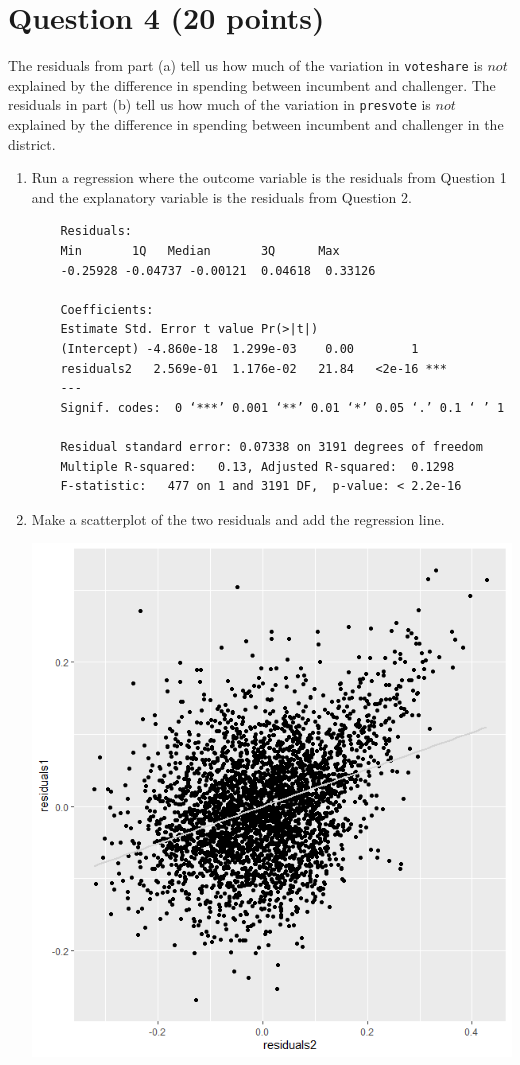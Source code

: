 \documentclass[12pt,letterpaper]{article}
\begin{document}
\newpage	
\section*{Question 4 (20 points)}
\noindent The residuals from part (a) tell us how much of the variation in \texttt{voteshare} is $not$ explained by the difference in spending between incumbent and challenger. The residuals in part (b) tell us how much of the variation in \texttt{presvote} is $not$ explained by the difference in spending between incumbent and challenger in the district.
	\begin{enumerate}
		\item Run a regression where the outcome variable is the residuals from Question 1 and the explanatory variable is the residuals from Question 2.
		
		\begin{verbatim}
	Residuals:
	Min       1Q   Median       3Q      Max 
	-0.25928 -0.04737 -0.00121  0.04618  0.33126 
	
	Coefficients:
	Estimate Std. Error t value Pr(>|t|)    
	(Intercept) -4.860e-18  1.299e-03    0.00        1    
	residuals2   2.569e-01  1.176e-02   21.84   <2e-16 ***
	---
	Signif. codes:  0 ‘***’ 0.001 ‘**’ 0.01 ‘*’ 0.05 ‘.’ 0.1 ‘ ’ 1
	
	Residual standard error: 0.07338 on 3191 degrees of freedom
	Multiple R-squared:   0.13,	Adjusted R-squared:  0.1298 
	F-statistic:   477 on 1 and 3191 DF,  p-value: < 2.2e-16
		\end{verbatim}
		
			\vspace{3cm}
		\item Make a scatterplot of the two residuals and add the regression line. 
			
		\vspace{3cm}
		\includegraphics{Q4P2.png}
		

\end{enumerate}
\end{document}
